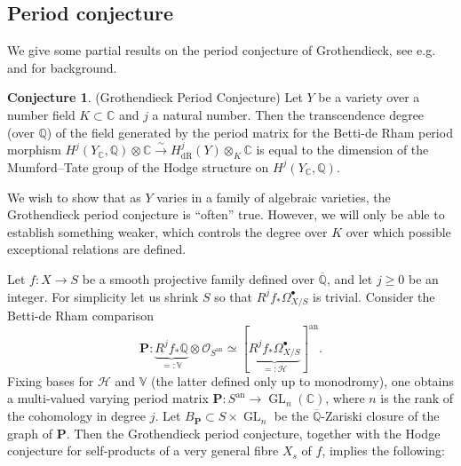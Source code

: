 \documentclass[10pt]{article}
\numberwithin{equation}{section}
\theoremstyle{plain}
\theoremstyle{definition}
\newtheorem{conj}[thm]{Conjecture}
\theoremstyle{remark}
\newcommand{\an}{\operatorname{an}}
\newcommand{\GL}{\operatorname{GL}}
\newcommand{\Qbar}{\overline{\mathbb{Q}}}
\newcommand{\Q}{\mathbb{Q}}
\begin{document}
\subsection{Period conjecture}\label{periodconj}

We give some partial results on the period conjecture of Grothendieck, see e.g. \cite[IX.2.2]{zbMATH00041964} and \cite[Sec. 7.5]{zbMATH02128361} for background. 

\begin{conj}(Grothendieck Period Conjecture)
\label{Gperconj}
Let $Y$ be a variety over a number field $K \subset \mathbb{C}$ and $j$ a natural number. Then the transcendence degree (over $\Q$) of the field generated by the period matrix for the Betti-de Rham period morphism $H^j(Y_{\mathbb{C}}, \mathbb{Q}) \otimes \mathbb{C} \xrightarrow{\sim} H^j_{\operatorname{dR}}(Y) \otimes_{K} \mathbb{C}$ is equal to the dimension of the Mumford--Tate group of the Hodge structure on $H^j(Y_{\mathbb{C}}, \mathbb{Q})$.
\end{conj}

We wish to show that as $Y$ varies in a family of algebraic varieties, the Grothendieck period conjecture is ``often'' true. However, we will only be able to establish something weaker, which controls the degree over $K$ over which possible exceptional relations are defined. 

Let $f : X \to S$ be a smooth projective family defined over $\Qbar$, and let $j \geq 0$ be an integer. For simplicity let us shrink $S$ so that $R^j f_{*} \Omega^{\bullet}_{X/S}$ is trivial. Consider the Betti-de Rham comparison 
\begin{equation}
    \mathbf{P} : \underbrace{R^j f_{*} \mathbb{Q}}_{=: \mathbb{V}} \otimes \mathcal{O}_{S^{\an}} \simeq [\underbrace{R^j f_{*} \Omega^{\bullet}_{X/S}}_{=: \mathcal{H}}]^{\an}.
\end{equation}
Fixing bases for $\mathcal{H}$ and $\mathbb{V}$ (the latter defined only up to monodromy), one obtains a multi-valued varying period matrix $\mathbf{P} : S^{\an} \to \GL_{n}(\mathbb{C})$, where $n$ is the rank of the cohomology in degree $j$. Let $B_{\mathbf{P}} \subset S \times \GL_{n}$ be the $\Qbar$-Zariski closure of the graph of $\mathbf{P}$. Then the Grothendieck period conjecture, together with the Hodge conjecture for self-products of a very general fibre $X_{s}$ of $f$, implies the following:
\end{document}

